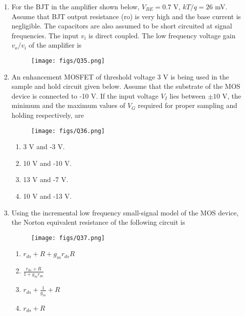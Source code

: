 \documentclass[a4paper, 11pt]{article}
\begin{document}
\begin{enumerate}
    \item For the BJT in the amplifier shown below, $V_{BE} = 0.7$ V, $kT/q = 26$ mV. Assume that BJT output resistance (ro) is very high and the base current is negligible. The capacitors are also assumed to be short circuited at signal frequencies. The input $v_i$ is direct coupled. The low frequency voltage gain $v_o/v_i$ of the amplifier is
    \begin{figure}[H]
        \centering
        \texttt{[image: figs/Q35.png]}
        \caption*{}
        \label{fig:q45}
    \end{figure}
    \begin{enumerate}
    \end{enumerate}

    \hfill{}

    \item An enhancement MOSFET of threshold voltage 3 V is being used in the sample and hold circuit given below. Assume that the substrate of the MOS device is connected to -10 V. If the input voltage $V_I$ lies between $\pm 10$ V, the minimum and the maximum values of $V_G$ required for proper sampling and holding respectively, are
    \begin{figure}[H]
        \centering
        \texttt{[image: figs/Q36.png]}
        \caption*{}
        \label{fig:q46}
    \end{figure}
    \begin{enumerate}
        \item 3 V and -3 V.
        \item 10 V and -10 V.
        \item 13 V and -7 V.
        \item 10 V and -13 V.
    \end{enumerate}

    \hfill{}

    \item Using the incremental low frequency small-signal model of the MOS device, the Norton equivalent resistance of the following circuit is
    \begin{figure}[H]
        \centering
        \texttt{[image: figs/Q37.png]}
        \caption*{}
        \label{fig:q47}
    \end{figure}
    \begin{enumerate}
        \item $r_{ds} + R + g_m r_{ds} R$
        \item $\frac{r_{ds} + R}{1 + g_m r_{ds}}$
        \item $r_{ds} + \frac{1}{g_m} + R$
        \item $r_{ds} + R$
    \end{enumerate}


\end{enumerate}
\end{document}
